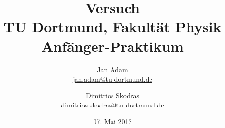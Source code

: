 



\title{Versuch\\				%
\large TU Dortmund, Fakultät Physik\\ 
\normalsize Anfänger-Praktikum}

\author{Jan Adam\\			%
{\small \href{jan.adam@tu-dortmund.de}{jan.adam@tu-dortmund.de}}	%
\and						%
Dimitrios Skodras\\					%
{\small \href{dimitrios.skodras@tu-dortmund.de}{dimitrios.skodras@tu-dortmund.de}}		%
}
\date{07. Mai 2013}				%





\maketitle					%
\thispagestyle{empty} 				%



\tableofcontents


\newpage					%



